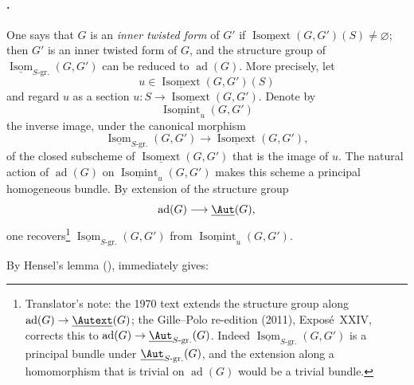 \paragraph{.}
One says that \(G\) is an \emph{inner twisted form} of \(G'\) if
\(\underline{\operatorname{Isomext}}(G,G')(S)\neq\varnothing\); then \(G'\)
is an inner twisted form of \(G\), and the structure group of
\(\underline{\operatorname{Isom}}_{S\text{-}\mathrm{gr.}}(G,G')\)
can be reduced to \(\operatorname{ad}(G)\). More precisely, let
\[
  u\in\underline{\operatorname{Isomext}}(G,G')(S)
\]
and regard \(u\) as a section
\(u:S\to\underline{\operatorname{Isomext}}(G,G')\). Denote by
\[
  \underline{\operatorname{Isomint}}_u(G,G')
\]
the inverse image, under the canonical morphism
\[
  \underline{\operatorname{Isom}}_{S\text{-}\mathrm{gr.}}(G,G')
  \longrightarrow
  \underline{\operatorname{Isomext}}(G,G'),
\]
of the closed subscheme of
\(\underline{\operatorname{Isomext}}(G,G')\) that is the image of
\(u\). The natural action of \(\operatorname{ad}(G)\) on
\(\underline{\operatorname{Isomint}}_u(G,G')\) makes this scheme a
principal homogeneous bundle. By extension of the structure
group
\[
  \operatorname{ad}(G)\longrightarrow\underline{\Aut}(G),
\]
one recovers\footnote{Translator's note: the 1970 text extends the structure group along
\(\operatorname{ad}(G)\to\underline{\Autext}(G)\); the Gille--Polo re-edition (2011),
Exposé~XXIV, corrects this to \(\operatorname{ad}(G)\to\underline{\Aut}_{S\text{-}\mathrm{gr.}}(G)\).
Indeed \(\underline{\operatorname{Isom}}_{S\text{-}\mathrm{gr.}}(G,G')\) is a principal
bundle under \(\underline{\Aut}_{S\text{-}\mathrm{gr.}}(G)\), and the extension along a
homomorphism that is trivial on \(\operatorname{ad}(G)\) would be a trivial bundle.}
\(\underline{\operatorname{Isom}}_{S\text{-}\mathrm{gr.}}(G,G')\)
from \(\underline{\operatorname{Isomint}}_u(G,G')\).

By Hensel's lemma \textup{()},  immediately
gives:
